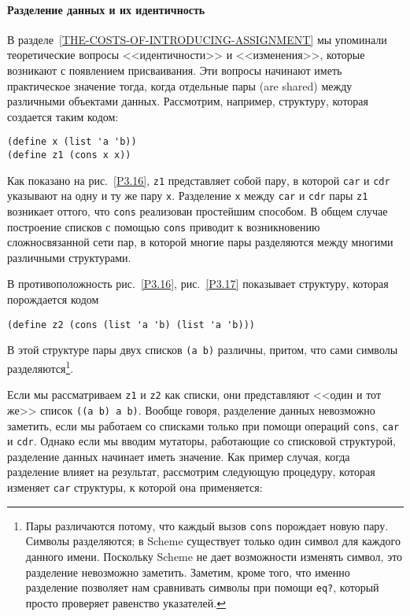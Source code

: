 \paragraph{Разделение данных и их идентичность}

В разделе~\ref{THE-COSTS-OF-INTRODUCING-ASSIGNMENT} мы
упоминали теоретические вопросы <<идентичности>> и <<изменения>>,
которые возникают с появлением присваивания.  Эти вопросы начинают
иметь практическое значение тогда, когда отдельные пары
 (are shared)
между различными объектами данных.  Рассмотрим, например, структуру,
которая создается таким кодом:

\begin{Verbatim}[fontsize=\small]
(define x (list 'a 'b))
(define z1 (cons x x))
\end{Verbatim}
Как показано на рис.~\ref{P3.16}, {\tt z1}
представляет собой пару, в которой {\tt car} и {\tt cdr}
указывают на одну и ту же пару {\tt x}.  Разделение
{\tt x} между {\tt car} и {\tt cdr} пары
{\tt z1} возникает оттого, что {\tt cons}
реализован простейшим способом. В общем случае построение списков с
помощью {\tt cons} приводит к возникновению сложносвязанной
сети пар, в которой многие пары разделяются между многими
различными структурами.

В противоположность рис.~\ref{P3.16},
рис.~\ref{P3.17} показывает структуру, которая порождается
кодом

\begin{Verbatim}[fontsize=\small]
(define z2 (cons (list 'a 'b) (list 'a 'b)))
\end{Verbatim}
В этой структуре пары двух списков {\tt (a b)} различны,
притом, что сами символы разделяются\footnote{Пары различаются потому, что каждый вызов
{\tt cons} порождает новую пару.  Символы разделяются; в Scheme
существует  только один символ для каждого данного имени.  Поскольку
Scheme не дает возможности изменять символ, это разделение невозможно
заметить.  Заметим, кроме того, что именно разделение позволяет нам
сравнивать символы при помощи {\tt eq?}, который просто
проверяет равенство указателей.
}.

Если мы рассматриваем {\tt z1} и {\tt z2}
как списки, они представляют <<один и тот же>> список
{\tt ((a b) a b)}.  Вообще говоря, разделение данных невозможно
заметить, если мы работаем со списками только при помощи операций
{\tt cons}, {\tt car} и {\tt cdr}.  Однако если
мы вводим мутаторы, работающие со списковой структурой, разделение
данных начинает иметь значение.  Как пример случая, когда разделение
влияет на результат, рассмотрим следующую процедуру, которая изменяет
{\tt car} структуры, к которой она применяется:

